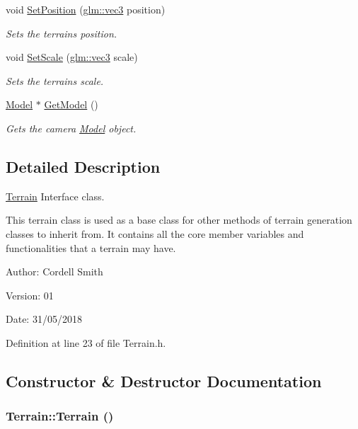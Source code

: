 \begin{CompactItemize}
void \hyperlink{class_terrain_33990e5363ba3dc351abd313c2832edb}{SetPosition} (\hyperlink{group__core__types_g1c47e8b3386109bc992b6c48e91b0be7}{glm::vec3} position)
\begin{CompactList}\small\item\em Sets the terrains position. \item\end{CompactList}\item 
void \hyperlink{class_terrain_ebecef9a3ffd4cedb898013e7087ec58}{SetScale} (\hyperlink{group__core__types_g1c47e8b3386109bc992b6c48e91b0be7}{glm::vec3} scale)
\begin{CompactList}\small\item\em Sets the terrains scale. \item\end{CompactList}\item 
\hyperlink{class_model}{Model} $\ast$ \hyperlink{class_terrain_3a0c740b9ab0a9f68617ee6fb893bf94}{GetModel} ()
\begin{CompactList}\small\item\em Gets the camera \hyperlink{class_model}{Model} object. \item\end{CompactList}\end{CompactItemize}


\subsection{Detailed Description}
\hyperlink{class_terrain}{Terrain} Interface class. 

This terrain class is used as a base class for other methods of terrain generation classes to inherit from. It contains all the core member variables and functionalities that a terrain may have.

\begin{Desc}
\item[Author:]Cordell Smith \end{Desc}
\begin{Desc}
\item[Version:]01 \end{Desc}
\begin{Desc}
\item[Date:]31/05/2018 \end{Desc}


Definition at line 23 of file Terrain.h.

\subsection{Constructor \& Destructor Documentation}
\hypertarget{class_terrain_7160a06ab07a86ed97d23374405e8ef6}{
\subsubsection[Terrain]{\setlength{\rightskip}{0pt plus 5cm}Terrain::Terrain ()}}
\label{class_terrain_7160a06ab07a86ed97d23374405e8ef6}


